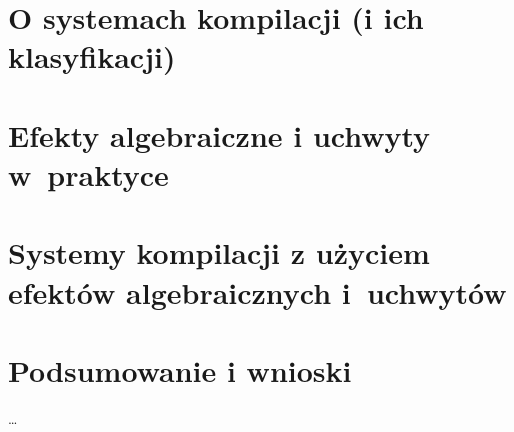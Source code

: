 \documentclass[shortabstract]{iithesis}
\begin{document}
\cite{bauer2018algebraic}

\chapter{O systemach kompilacji (i ich klasyfikacji)}

\chapter{Efekty algebraiczne i uchwyty w~praktyce}

\chapter{Systemy kompilacji z użyciem efektów algebraicznych i~uchwytów}

\chapter{Podsumowanie i wnioski}

\ldots


\nocite{biernacki2017handle}
\nocite{biernacki2019abstracting}
\nocite{biernacki2019binders}
\nocite{pretnar2015introduction}



\end{document}
